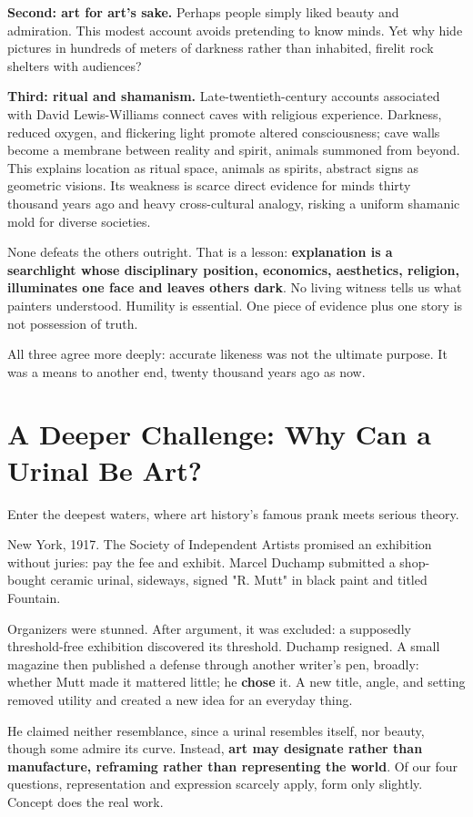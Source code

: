 \textbf{Second: art for art's sake.} Perhaps people simply liked beauty and admiration. This modest account avoids pretending to know minds. Yet why hide pictures in hundreds of meters of darkness rather than inhabited, firelit rock shelters with audiences?

\textbf{Third: ritual and shamanism.} Late-twentieth-century accounts associated with David Lewis-Williams connect caves with religious experience. Darkness, reduced oxygen, and flickering light promote altered consciousness; cave walls become a membrane between reality and spirit, animals summoned from beyond. This explains location as ritual space, animals as spirits, abstract signs as geometric visions. Its weakness is scarce direct evidence for minds thirty thousand years ago and heavy cross-cultural analogy, risking a uniform shamanic mold for diverse societies.

None defeats the others outright. That is a lesson: \textbf{explanation is a searchlight whose disciplinary position, economics, aesthetics, religion, illuminates one face and leaves others dark}. No living witness tells us what painters understood. Humility is essential. One piece of evidence plus one story is not possession of truth.

All three agree more deeply: accurate likeness was not the ultimate purpose. It was a means to another end, twenty thousand years ago as now.

\section[Why Can a Urinal Be Art?]{A Deeper Challenge: Why Can a Urinal Be Art?}
Enter the deepest waters, where art history's famous prank meets serious theory.

New York, 1917. The Society of Independent Artists promised an exhibition without juries: pay the fee and exhibit. Marcel Duchamp submitted a shop-bought ceramic urinal, sideways, signed "R. Mutt" in black paint and titled Fountain.

Organizers were stunned. After argument, it was excluded: a supposedly threshold-free exhibition discovered its threshold. Duchamp resigned. A small magazine then published a defense through another writer's pen, broadly: whether Mutt made it mattered little; he \textbf{chose} it. A new title, angle, and setting removed utility and created a new idea for an everyday thing.

He claimed neither resemblance, since a urinal resembles itself, nor beauty, though some admire its curve. Instead, \textbf{art may designate rather than manufacture, reframing rather than representing the world}. Of our four questions, representation and expression scarcely apply, form only slightly. Concept does the real work.

